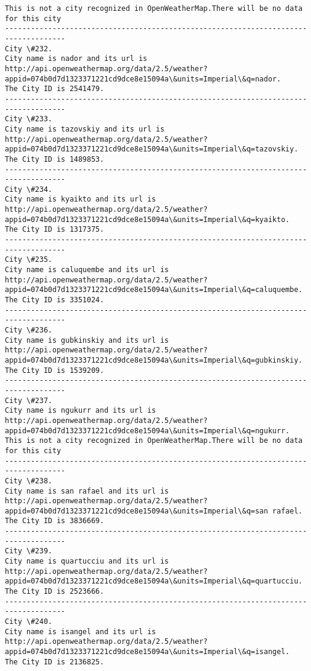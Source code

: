 \documentclass[11pt]{article}
\begin{document}
\begin{Verbatim}[commandchars=\\\{\}]
This is not a city recognized in OpenWeatherMap.There will be no data for this city
------------------------------------------------------------------------------------
City \#232.
City name is nador and its url is http://api.openweathermap.org/data/2.5/weather?appid=074b0d7d1323371221cd9dce8e15094a\&units=Imperial\&q=nador.
The City ID is 2541479.
------------------------------------------------------------------------------------
City \#233.
City name is tazovskiy and its url is http://api.openweathermap.org/data/2.5/weather?appid=074b0d7d1323371221cd9dce8e15094a\&units=Imperial\&q=tazovskiy.
The City ID is 1489853.
------------------------------------------------------------------------------------
City \#234.
City name is kyaikto and its url is http://api.openweathermap.org/data/2.5/weather?appid=074b0d7d1323371221cd9dce8e15094a\&units=Imperial\&q=kyaikto.
The City ID is 1317375.
------------------------------------------------------------------------------------
City \#235.
City name is caluquembe and its url is http://api.openweathermap.org/data/2.5/weather?appid=074b0d7d1323371221cd9dce8e15094a\&units=Imperial\&q=caluquembe.
The City ID is 3351024.
------------------------------------------------------------------------------------
City \#236.
City name is gubkinskiy and its url is http://api.openweathermap.org/data/2.5/weather?appid=074b0d7d1323371221cd9dce8e15094a\&units=Imperial\&q=gubkinskiy.
The City ID is 1539209.
------------------------------------------------------------------------------------
City \#237.
City name is ngukurr and its url is http://api.openweathermap.org/data/2.5/weather?appid=074b0d7d1323371221cd9dce8e15094a\&units=Imperial\&q=ngukurr.
This is not a city recognized in OpenWeatherMap.There will be no data for this city
------------------------------------------------------------------------------------
City \#238.
City name is san rafael and its url is http://api.openweathermap.org/data/2.5/weather?appid=074b0d7d1323371221cd9dce8e15094a\&units=Imperial\&q=san rafael.
The City ID is 3836669.
------------------------------------------------------------------------------------
City \#239.
City name is quartucciu and its url is http://api.openweathermap.org/data/2.5/weather?appid=074b0d7d1323371221cd9dce8e15094a\&units=Imperial\&q=quartucciu.
The City ID is 2523666.
------------------------------------------------------------------------------------
City \#240.
City name is isangel and its url is http://api.openweathermap.org/data/2.5/weather?appid=074b0d7d1323371221cd9dce8e15094a\&units=Imperial\&q=isangel.
The City ID is 2136825.

\end{Verbatim}
\end{document}
